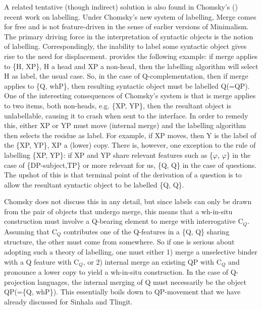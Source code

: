 \documentclass[11pt]{article}
\renewcommand{\phi}{\varphi}
\begin{document}
A related tentative (though indirect) solution is also found in Chomsky's (\citeyear{Chomsky:13, chomsky:15}) recent work on labelling. Under Chomsky's new system of labelling, Merge comes for free and is not feature-driven in the sense of earlier versions of Minimalism. The primary driving force in the interpretation of syntactic objects is the notion of labelling. Correspondingly, the inability to label some syntactic object gives rise to the need for displacement. \cite{Chomsky:13} provides the following example: if merge applies to \{H, XP\}, H a head and XP a non-head, then the labelling algorithm will select H as label, the usual case. So, in the case of Q-complementation, then if merge applies to \{Q, whP\}, then resulting syntactic object must be labelled Q(=QP). One of the interesting consequences of Chomsky's system is that is merge applies to two items, both non-heads, e.g. \{XP, YP\}, then the resultant object is unlabellable, causing it to crash when sent to the interface. In order to remedy this, either XP or YP must move (internal merge) and the labelling algorithm then selects the residue as label. For example, if XP moves, then Y is the label of the \{XP, YP\}, XP a (lower) copy. There is, however, one exception to the rule of labelling \{XP, YP\}: if XP and YP share relevant features such as \{$\phi$, $\phi$\} in the case of \{DP-subject,TP\} or more relevant for us, \{Q, Q\} in the case of questions. The upshot of this is that terminal point of the derivation of a question is to allow the resultant syntactic object to be labelled \{Q, Q\}.

Chomsky does not discuss this in any detail, but since labels can only be drawn from the pair of objects that undergo merge, this means that a wh-in-situ construction must involve a Q-bearing element to merge with interrogative C$_Q$. Assuming that C$_Q$ contributes one of the Q-features in a \{Q, Q\} sharing structure, the other must come from somewhere. So if one is serious about adopting such a theory of labelling, one must either 1) merge a unselective binder with a Q feature with C$_Q$, or 2) internal merge an existing QP with C$_Q$ and pronounce a lower copy to yield a wh-in-situ construction. In the case of Q-projection languages, the internal merging of Q must necessarily be the object QP(=\{Q, whP\}). This essentially boils down to QP-movement that we have already discussed for Sinhala and Tlingit.
\end{document}
